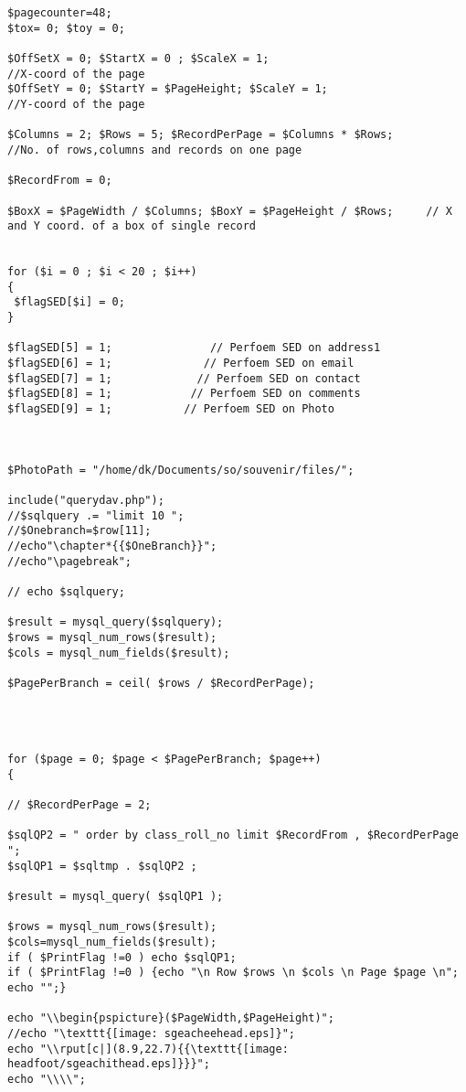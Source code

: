 \begin{verbatim}
$pagecounter=48;
$tox= 0; $toy = 0; 

$OffSetX = 0; $StartX = 0 ; $ScaleX = 1;                                 //X-coord of the page
$OffSetY = 0; $StartY = $PageHeight; $ScaleY = 1;                      //Y-coord of the page

$Columns = 2; $Rows = 5; $RecordPerPage = $Columns * $Rows;             //No. of rows,columns and records on one page

$RecordFrom = 0;

$BoxX = $PageWidth / $Columns; $BoxY = $PageHeight / $Rows;		// X and Y coord. of a box of single record


for ($i = 0 ; $i < 20 ; $i++)
{
 $flagSED[$i] = 0;
}

$flagSED[5] = 1;               // Perfoem SED on address1
$flagSED[6] = 1;              // Perfoem SED on email
$flagSED[7] = 1;             // Perfoem SED on contact
$flagSED[8] = 1;            // Perfoem SED on comments
$flagSED[9] = 1;           // Perfoem SED on Photo



$PhotoPath = "/home/dk/Documents/so/souvenir/files/";

include("querydav.php");
//$sqlquery .= "limit 10 ";
//$Onebranch=$row[11];
//echo"\chapter*{{$OneBranch}}";
//echo"\pagebreak";

// echo $sqlquery;

$result = mysql_query($sqlquery);
$rows = mysql_num_rows($result);
$cols = mysql_num_fields($result);

$PagePerBranch = ceil( $rows / $RecordPerPage);




for ($page = 0; $page < $PagePerBranch; $page++)
{

// $RecordPerPage = 2;

$sqlQP2 = " order by class_roll_no limit $RecordFrom , $RecordPerPage ";  
$sqlQP1 = $sqltmp . $sqlQP2 ;

$result = mysql_query( $sqlQP1 );

$rows = mysql_num_rows($result);  
$cols=mysql_num_fields($result);  
if ( $PrintFlag !=0 ) echo $sqlQP1;
if ( $PrintFlag !=0 ) {echo "\n Row $rows \n $cols \n Page $page \n"; echo "";}

echo "\\begin{pspicture}($PageWidth,$PageHeight)";  
//echo "\texttt{[image: sgeacheehead.eps]}";
echo "\\rput[c|](8.9,22.7){{\texttt{[image: headfoot/sgeachithead.eps]}}}";
echo "\\\\";



\end{verbatim}
